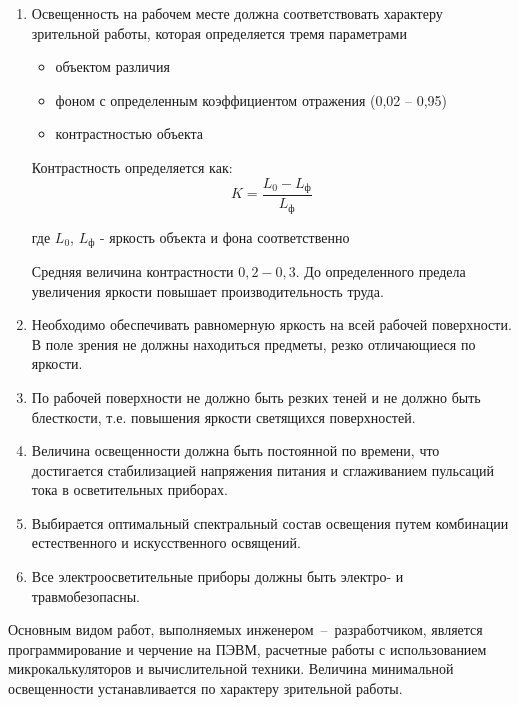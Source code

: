 \begin{enumerate}
    \item   Освещенность на рабочем месте должна соответствовать характеру
            зрительной работы, которая определяется тремя параметрами
        \begin{itemize}
            \item объектом различия
            \item фоном с определенным коэффициентом отражения (0,02 – 0,95)
            \item контрастностью объекта
        \end{itemize}
    Контрастность определяется как:
    \begin{equation}
    \label{lighting_contrast}
        K = \frac{L_0 - L_\text{ф}}{L_\text{ф}}
    \end{equation}

    где $L_0$, $L_\text{ф}$ - яркость объекта и фона соответственно

    Средняя величина контрастности $0,2 - 0,3$. До определенного предела увеличения
    яркости повышает производительность труда.

    \item   Необходимо обеспечивать равномерную яркость на всей рабочей поверхности.
            В поле зрения не должны находиться предметы, резко отличающиеся по яркости.

    \item   По рабочей поверхности не должно быть резких теней и не должно быть
            блесткости, т.е. повышения яркости светящихся поверхностей.

    \item   Величина освещенности должна быть постоянной по времени, что достигается
            стабилизацией напряжения питания и сглаживанием пульсаций тока в
            осветительных приборах.

    \item   Выбирается оптимальный спектральный состав освещения путем комбинации
            естественного и искусственного освящений.

    \item   Все электроосветительные приборы должны быть электро- и травмобезопасны.
\end{enumerate}

Основным видом работ, выполняемых инженером~--~разработчиком, является программирование
и черчение на ПЭВМ, расчетные работы с использованием микрокалькуляторов и вычислительной
техники. Величина минимальной освещенности устанавливается по характеру зрительной работы.


